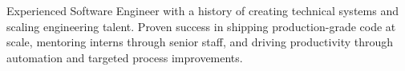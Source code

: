 \documentclass[MMMMyyyy,nonstopmode]{simpleresumecv_stacked}
\newcommand{\comment}[1]{\ignorespaces} %
\begin{document}
\begin{Body}

\item




\comment{
Senior Software Engineer with deep expertise in distributed systems, infrastructure automation, and high-performance backend development. 
Proven ability to ship production-grade code at scale and solve complex architectural bottlenecks as an individual contributor.
}


\comment{Staff} Experienced Software Engineer with a history of creating technical systems and scaling engineering talent. 
Proven success in shipping production-grade code at scale, mentoring interns through senior staff, and driving \comment{organizational} productivity through automation and targeted process improvements.


\end{Body}
\end{document}
